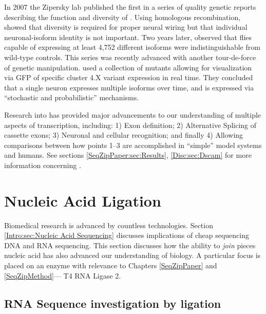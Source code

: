     In 2007 the Zipersky lab published \citep{Hattori2007} the first in a series of quality genetic reports describing the function and diversity of \dscam{}. Using homologous recombination, \citet{Hattori2007} showed that \dscam{} diversity is required for proper neural wiring but that individual neuronal-isoform identity is not important. Two years later, \citet{Hattori2009} observed that flies capable of expressing at least 4,752 different \dscam{} isoforms were indistinguishable from wild-type controls. This series was recently advanced with another tour-de-force of genetic manipulation. \citet{Miura2013b} used a collection of \dscam{} mutants allowing for visualization via GFP of specific cluster 4.X variant expression in real time. They concluded that a single neuron expresses multiple \dscam{} isoforms over time, and \dscam{} is expressed via ``stochastic and probabilistic'' mechanisms.

    Research into \flies{} \dscam{} has provided major advancements to our understanding of multiple aspects of transcription, including: 1) Exon definition; 2) Alternative Splicing of cassette exons; 3) Neuronal and cellular recognition; and finally 4) Allowing comparisons between how points 1--3 are accomplished in ``simple'' model systems and humans. See sections \ref{SeqZipPaper:sec:Results}, \ref{Disc:sec:Dscam} for more information concerning \dscam{}.

\section{Nucleic Acid Ligation}
  \label{Intro:sec:Nucleic Acid Ligation}

  Biomedical research is advanced by countless technologies. Section \ref{Intro:sec:Nucleic Acid Sequencing} discusses implications of cheap sequencing DNA and RNA sequencing. This section discusses how the ability to \textit{join} pieces nucleic acid has also advanced our understanding of biology. A particular focus is placed on an enzyme with relevance to Chapters \ref{SeqZipPaper} and \ref{SeqZipMethod}--- T4 RNA Ligase 2.

  \subsection{RNA Sequence investigation by ligation}
    \label{Intro:subsec:Ligation}

